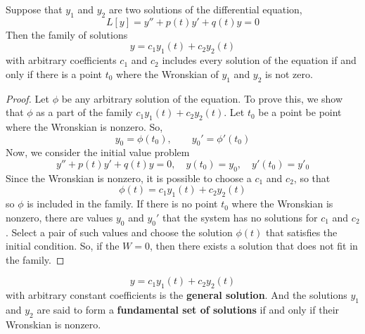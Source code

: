     \begin{theorem}
        Suppose that $y_1$ and $y_2$ are two solutions of the differential equation,
        \begin{equation*}
            L[y] = y'' + p(t)y' + q(t)y = 0
        \end{equation*}
        Then the family of solutions
        \begin{equation*}
            y = c_1y_1(t) + c_2y_2(t)
        \end{equation*}
        with arbitrary coefficients $c_1$ and $c_2$ includes every solution of the equation if and only if there is a point $t_0$ where the Wronskian of $y_1$ and $y_2$ is not zero.
    \end{theorem}
    \begin{proof}
        Let $\phi$ be any arbitrary solution of the equation. To prove this, we show that $\phi$ as a part of the family $c_1y_1(t) + c_2y_2(t)$. Let $t_0$ be a point be point where the Wronskian is nonzero. So,
        \begin{equation*}
            y_0 = \phi(t_0), \qquad y_0' = \phi'(t_0)
        \end{equation*}
        Now, we consider the initial value problem
        \begin{equation*}
            y'' + p(t)y' + q(t)y = 0, \quad y(t_0) = y_0, \quad y'(t_0) = y'_0
        \end{equation*}
        Since the Wronskian is nonzero, it is possible to choose a $c_1$ and $c_2$, so that 
        \begin{equation*}
            \phi(t) = c_1y_1(t) + c_2y_2(t) 
        \end{equation*}
        so $\phi$ is included in the family. If there is no point $t_0$ where the Wronskian is nonzero, there are values $y_0$ and $y_0'$ that the system has no solutions for $c_1$ and $c_2$. Select a pair of such values and choose the solution $\phi(t)$ that satisfies the initial condition. So, if the $W = 0$, then there exists a solution that does not fit in the family.
    \end{proof}
    \begin{equation*}
        y = c_1y_1(t) + c_2y_2(t)
    \end{equation*}
    with arbitrary constant coefficients is the \textbf{general solution}. And the solutions $y_1$ and $y_2$ are said to form a \textbf{fundamental set of solutions} if and only if their Wronskian is nonzero.